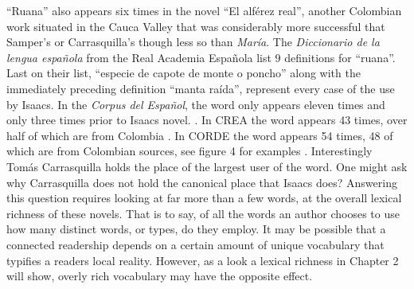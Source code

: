 \documentclass[12pt]{report}
\begin{document}
\enquote{Ruana} also appears six times in the novel \enquote{El alférez real}, another Colombian work situated in the Cauca Valley that was considerably more successful that Samper's or Carrasquilla's though less so than \textit{María}.
The \textit{Diccionario de la lengua española} from the Real Academia Española list 9 definitions for \enquote{ruana}.
Last on their list, \enquote{especie de capote de monte o poncho} along with the immediately preceding definition \enquote{manta raída}, represent every case of the use by Isaacs.
In the \textit{Corpus del Español}, the word only appears eleven times and only three times prior to Isaacs novel. \autocite{Davies2012}. 
In CREA the word appears 43 times, over half of which are from Colombia \autocite*{Crea}.
In CORDE the word appears 54 times, 48 of which are from Colombian sources, see figure 4 for examples \autocite*{Corde}.
Interestingly Tomás Carrasquilla holds the place of the largest user of the word.
One might ask why Carrasquilla does not hold the canonical place that Isaacs does?
Answering this question requires looking at far more than a few words, at the overall lexical richness of these novels.
That is to say, of all the words an author chooses to use how many distinct words, or types, do they employ.
It may be possible that a connected readership depends on a certain amount of unique vocabulary that typifies a readers local reality.
However, as a look a lexical richness in Chapter 2 will show, overly rich vocabulary may have the opposite effect. 
\end{document}
